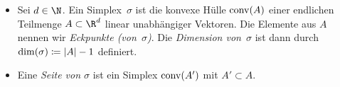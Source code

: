 \begin{thDef}
    \label{gsc:def:simplex}
    \hfill
    \begin{itemize}
        \item
            Sei $d\in\N$. Ein Simplex~$\sigma$ ist die konvexe Hülle $\operatorname{conv}(A)$ einer 
            endlichen Teilmenge $A\subset\R^d$ linear unabhängiger Vektoren.
            Die Elemente aus $A$ nennen wir \emph{Eckpunkte (von~$\sigma$)}. 
            Die \emph{Dimension von~$\sigma$} ist dann durch 
            $\dim(\sigma) \coloneqq \lvert A\rvert-1$ definiert.
        \item
            Eine \emph{Seite von $\sigma$} ist ein Simplex $\operatorname{conv}(A')$ mit
            $A'\subset A$.
    \end{itemize}
\end{thDef}
%
%            

